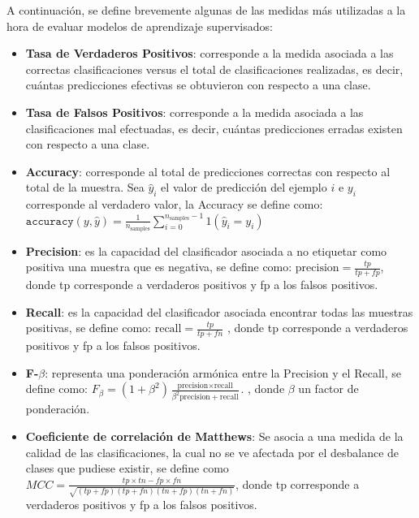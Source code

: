 A continuación, se define brevemente algunas de las medidas más utilizadas a la hora de evaluar modelos de aprendizaje supervisados:

\begin{itemize}
	
	\item \textbf{Tasa de Verdaderos Positivos}: corresponde a la medida asociada a las correctas clasificaciones versus el total de clasificaciones realizadas, es decir, cuántas predicciones efectivas se obtuvieron con respecto a una clase.
	
	\item \textbf{Tasa de Falsos Positivos}: corresponde a la medida asociada a las clasificaciones mal efectuadas, es decir, cuántas predicciones erradas existen con respecto a una clase.
	
	
	\item \textbf{Accuracy}: corresponde al total de predicciones correctas con respecto al total de la muestra. Sea $\hat{y}_i$ el valor de predicción del ejemplo $i$ e $y_{i}$ corresponde al verdadero valor, la Accuracy se define como: $\texttt{accuracy}(y, \hat{y}) = \frac{1}{n_\text{samples}} \sum_{i=0}^{n_\text{samples}-1} 1(\hat{y}_i = y_i)$
	
	\item \textbf{Precision}: es la capacidad del clasificador asociada a no etiquetar como positiva una muestra que es negativa, se define como: $\text{precision} = \frac{tp}{tp + fp}$, donde tp corresponde a verdaderos positivos y fp a los falsos positivos.
	
	
	\item \textbf{Recall}: es la capacidad del clasificador asociada encontrar todas las muestras positivas, se define como: $\text{recall} = \frac{tp}{tp + fn}$ , donde tp corresponde a verdaderos positivos y fp a los falsos positivos.
	
	\item \textbf{F-$\beta$}: representa una ponderación armónica entre la Precision y el Recall, se define como: $F_\beta = (1 + \beta^2) \frac{\text{precision} \times \text{recall}}{\beta^2 \text{precision} + \text{recall}}.$ , donde $\beta$ un factor de ponderación.
	
	\item \textbf{Coeficiente de correlación de Matthews}: Se asocia a una medida de la calidad de las clasificaciones, la cual no se ve afectada por el desbalance de clases que pudiese existir, se define como $MCC = \frac{tp \times tn - fp \times fn}{\sqrt{(tp + fp)(tp + fn)(tn + fp)(tn + fn)}}$, donde tp corresponde a verdaderos positivos y fp a los falsos positivos.
	
\end{itemize}
	
